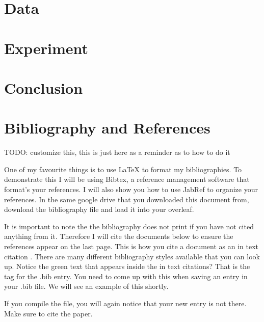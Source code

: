 \documentclass[paper=a4, fontsize=11pt]{scrartcl}
\numberwithin{equation}{section}		%
\numberwithin{table}{section}				%
\begin{document}
\section{Data}\label{sec: data}

\section{Experiment}\label{sec: experiment}

\section{Conclusion}\label{sec: conlusion}

\section{Bibliography and References}\label{sec: bibliography}

TODO: customize this, this is just here as a reminder as to how to do it

One of my favourite things is to use \LaTeX{} to format my bibliographies. To demonstrate this I will be using Bibtex, a reference management software that format's your references. I will also show you how to use JabRef to organize your references. In the same google drive that you downloaded this document from, download the bibliography file and load it into your overleaf. 


It is important to note the the bibliography does not print if you have not cited anything from it. Therefore I will cite the documents below to ensure the references appear on the last page. This is how you cite a document as an in text citation \cite{LuTao2021Daco}. There are many different bibliography styles available that you can look up. Notice the green text that appears inside the in text citations? That is the tag for the .bib entry. You need to come up with this when saving an entry in your .bib file. We will see an example of this shortly. 


If you compile the file, you will again notice that your new entry is not there. Make sure to cite the paper. 

 
\clearpage
 



\end{document}
